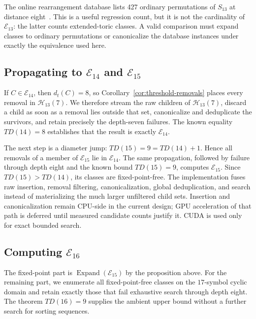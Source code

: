 \documentclass[11pt]{article}
\theoremstyle{definition}
\theoremstyle{remark}
\newcommand{\En}{\mathcal E}
\newcommand{\Hn}{\mathcal H}
\newcommand{\dist}{d_t}
\begin{document}
The online rearrangement database lists 427 ordinary permutations of
$S_{13}$ at distance eight~\cite{RearrangementDatabase2026}.  This is a
useful regression count, but it is not the cardinality of $\En_{13}$:
the latter counts extended-toric classes.  A valid comparison must expand
classes to ordinary permutations or canonicalize the database instances
under exactly the equivalence used here.

\subsection{Propagating to \texorpdfstring{$\En_{14}$}{E14} and
\texorpdfstring{$\En_{15}$}{E15}}

If $C\in\En_{14}$, then $\dist(C)=8$, so
Corollary~\ref{cor:threshold-removals} places every removal in
$\Hn_{13}(7)$.  We therefore stream the raw children of $\Hn_{13}(7)$,
discard a child as soon as a removal lies outside that set, canonicalize and
deduplicate the survivors, and retain precisely the depth-seven failures.
The known equality $TD(14)=8$ establishes that
the result is exactly $\En_{14}$.

The next step is a diameter jump: $TD(15)=9=TD(14)+1$.  Hence all removals
of a member of $\En_{15}$ lie in $\En_{14}$.  The same propagation, followed
by failure through depth eight and the known bound $TD(15)=9$, computes
$\En_{15}$.  Since $TD(15)>TD(14)$, its classes are fixed-point-free.
The implementation fuses raw insertion, removal filtering, canonicalization,
global deduplication, and search instead of materializing the much larger
unfiltered child sets.  Insertion and canonicalization remain CPU-side in the
current design; GPU acceleration of that path is deferred until measured
candidate counts justify it.  CUDA is used only for exact bounded search.

\subsection{Computing \texorpdfstring{$\En_{16}$}{E16}}

The fixed-point part is $\operatorname{Expand}(\En_{15})$ by the proposition
above.  For the remaining part, we enumerate all fixed-point-free classes on
the $17$-symbol cyclic domain and retain exactly those that fail exhaustive
search through depth eight.  The theorem $TD(16)=9$ supplies the ambient upper
bound without a further search for sorting sequences.
\end{document}

